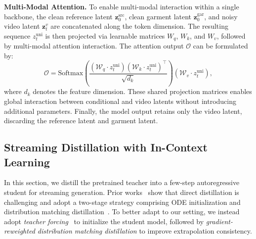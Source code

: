 \documentclass{llmxive}
\begin{document}
\noindent
\textbf{Multi-Modal Attention.}
% 
To enable multi-modal interaction within a single backbone, the clean reference latent $\mathbf{z}^{\text{src}}_{0}$, clean garment latent $\mathbf{z}^{\text{gar}}_{0}$, and noisy video latent $\mathbf{z}^{v}_{t}$ are concatenated along the token dimension. The resulting sequence $z_t^{\text{uni}}$ is then projected via learnable matrices $W_q$, $W_k$, and $W_v$, followed by multi-modal attention interaction. The attention output $\mathcal{O}$ can be formulated by:
% 
\begin{equation}
    \mathcal{O} = \text{Softmax}(\frac{(\mathcal{W}_q \cdot z_t^{\text{uni}} )(\mathcal{W}_k \cdot z_t^{\text{uni}})^\top}{\sqrt{d_k}})(\mathcal{W}_v \cdot z_t^{\text{uni}}),
\end{equation}
% 
where $d_k$ denotes the feature dimension.
% 
These shared projection matrices enables global interaction between conditional and video latents without introducing additional parameters.
% 
Finally, the model output retains only the video latent, discarding the reference latent and garment latent.





\subsection{Streaming Distillation with In-Context Learning}
\label{sec:3-2}
%
In this section, we distill the pretrained teacher into a few-step autoregressive student for streaming generation.
% 
Prior works~\cite{yin2025slow,huang2025self,zhu2026causal} show that direct distillation is challenging and adopt a two-stage strategy comprising ODE initialization and distribution matching distillation~\cite{yin2024improved}.
% 
To better adapt to our setting, we instead adopt \textit{teacher forcing}~\cite{gao2024ca2,hu2024acdit,zhang2025test} to initialize the student model, followed by \textit{gradient-reweighted distribution matching distillation} to improve extrapolation consistency.
\end{document}
